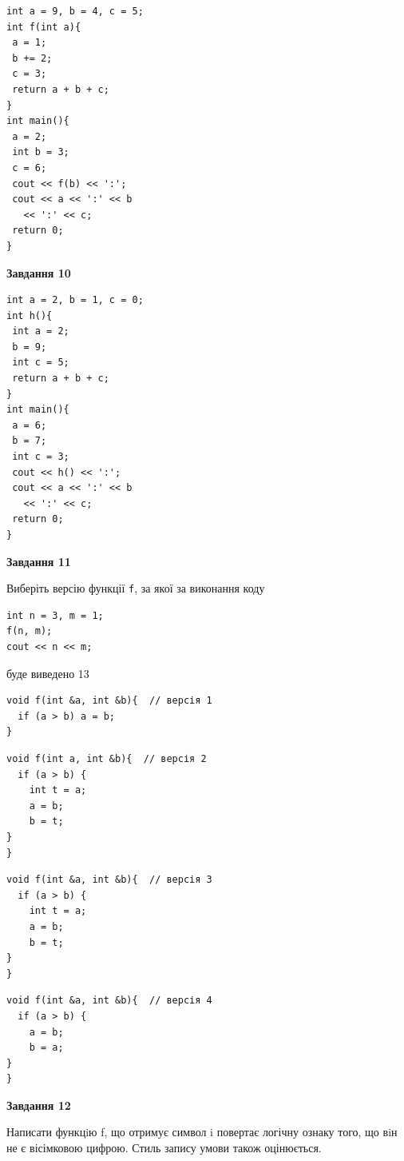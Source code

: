 \documentclass[12pt, ukrainian]{article}
\def\code#1{\Verb!#1!}
\begin{document}
{\begin {large}
\begin{minipage}[t]{7.0cm}
\begin{verbatim}
int a = 9, b = 4, c = 5;
int f(int a){
 a = 1;
 b += 2;
 c = 3;
 return a + b + c;
}
int main(){
 a = 2;
 int b = 3;
 c = 6;
 cout << f(b) << ':';
 cout << a << ':' << b 
   << ':' << c;
 return 0;
}
\end{verbatim}



\begin{center}
\textbf{Завдання 10}
\end{center}
\vspace{-8mm}

\begin{verbatim}
int a = 2, b = 1, c = 0;
int h(){
 int a = 2;
 b = 9;
 int c = 5;
 return a + b + c;
}
int main(){
 a = 6;
 b = 7;
 int c = 3;
 cout << h() << ':';
 cout << a << ':' << b 
   << ':' << c;
 return 0;
}
\end{verbatim}

\end{minipage}
\vline \hspace{1mm}
\begin{minipage}[t]{11.0cm}

\begin{center}
\textbf{Завдання 11}
\end{center}
Виберіть версію функції \code{f}, за якої за виконання коду
\begin{verbatim}
int n = 3, m = 1;
f(n, m);
cout << n << m;
\end{verbatim}

буде виведено 13

\begin{verbatim}
void f(int &a, int &b){  // версія 1
  if (a > b) a = b;
}
\end{verbatim}

\vspace{-8mm}\begin{verbatim}
void f(int a, int &b){  // версія 2
  if (a > b) {
    int t = a;
    a = b;
    b = t;
}  
}
\end{verbatim}

\vspace{-8mm}\begin{verbatim}
void f(int &a, int &b){  // версія 3
  if (a > b) {
    int t = a;
    a = b;
    b = t;
}  
}
\end{verbatim}

\vspace{-8mm}\begin{verbatim}
void f(int &a, int &b){  // версія 4
  if (a > b) {
    a = b;
    b = a;
}  
}
\end{verbatim}



\begin{center}
\textbf{Завдання 12}
\end{center}

Написати функцiю f, що отримує символ i повертає логічну ознаку того, що вiн не є вісімковою цифрою. Стиль запису умови також оцінюється.\par

\end{minipage}

\end {large}}
\end{document}
